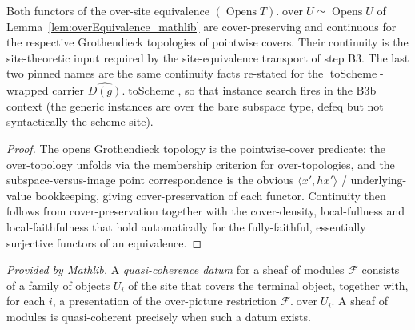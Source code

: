 \begin{lemma}
  \label{lem:overEquivalence_isContinuous}
  Both functors of the over-site equivalence
  \((\operatorname{Opens} T).\operatorname{over} U \simeq \operatorname{Opens} U\) of
  Lemma~\ref{lem:overEquivalence_mathlib} are cover-preserving and continuous for the respective
  Grothendieck topologies of pointwise covers. Their continuity is the site-theoretic input required
  by the site-equivalence transport of step B3. The last two pinned names are the same continuity
  facts re-stated for the \(\operatorname{toScheme}\)-wrapped carrier
  \(\widehat{D(g)}.\operatorname{toScheme}\), so that instance search fires in the B3b context (the
  generic instances are over the bare subspace type, defeq but not syntactically the scheme site).
\end{lemma}
\begin{proof}
  The opens Grothendieck topology is the pointwise-cover predicate; the over-topology unfolds via
  the membership criterion for over-topologies, and the subspace-versus-image point correspondence is
  the obvious \(\langle x', hx'\rangle\) / underlying-value bookkeeping, giving cover-preservation of
  each functor. Continuity then follows from cover-preservation together with the cover-density,
  local-fullness and local-faithfulness that hold automatically for the fully-faithful, essentially
  surjective functors of an equivalence.
\end{proof}

\begin{lemma}
  \label{lem:quasicoherentData_mathlib}
  \mathlibok
  \textit{Provided by Mathlib.}
  A \emph{quasi-coherence datum} for a sheaf of modules \(\mathcal{F}\) consists of a family of objects
  \(U_i\) of the site that covers the terminal object, together with, for each \(i\), a presentation of
  the over-picture restriction \(\mathcal{F}.\operatorname{over} U_i\). A sheaf of modules is
  quasi-coherent precisely when such a datum exists.
\end{lemma}

